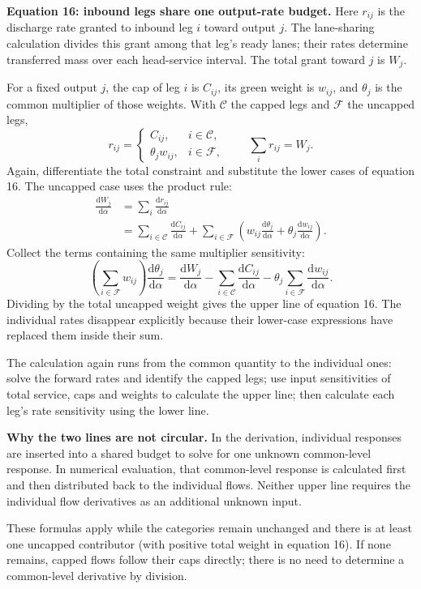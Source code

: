 \documentclass[11pt,a4paper]{article}
\newcommand{\der}[1]{\frac{\mathrm d #1}{\mathrm d\alpha}}
\begin{document}
\newpage
\textbf{Equation 16: inbound legs share one output-rate budget.}
Here $r_{ij}$ is the discharge rate granted to inbound leg $i$ toward
output $j$. The lane-sharing calculation divides this grant among that
leg's ready lanes; their rates determine transferred mass over each
head-service interval. The total grant toward $j$ is $W_j$.

For a fixed output $j$, the cap of leg $i$ is $C_{ij}$, its green weight
is $w_{ij}$, and $\theta_j$ is the common multiplier of those weights.
With $\mathcal C$ the capped legs and $\mathcal F$ the uncapped legs,
\[
 r_{ij}=
 \begin{cases}
 C_{ij},&i\in\mathcal C,\\
 \theta_jw_{ij},&i\in\mathcal F,
 \end{cases}
 \qquad \sum_i r_{ij}=W_j.
\]
Again, differentiate the total constraint and substitute the lower cases
of equation 16. The uncapped case uses the product rule:
\begin{align*}
 \der{W_j}
 &=\sum_i\der{r_{ij}}\\
 &=\sum_{i\in\mathcal C}\der{C_{ij}}
   +\sum_{i\in\mathcal F}
       \left(w_{ij}\der{\theta_j}
             +\theta_j\der{w_{ij}}\right).
\end{align*}
Collect the terms containing the same multiplier sensitivity:
\[
 \left(\sum_{i\in\mathcal F}w_{ij}\right)\der{\theta_j}
 =\der{W_j}-\sum_{i\in\mathcal C}\der{C_{ij}}
          -\theta_j\sum_{i\in\mathcal F}\der{w_{ij}}.
\]
Dividing by the total uncapped weight gives the upper line of equation 16.
The individual rates disappear explicitly because their lower-case
expressions have replaced them inside their sum.

The calculation again runs from the common quantity to the individual
ones: solve the forward rates and identify the capped legs; use input
sensitivities of total service, caps and weights to calculate the upper
line; then calculate each leg's rate sensitivity using the lower line.

\textbf{Why the two lines are not circular.}
In the derivation, individual responses are inserted into a shared budget
to solve for one unknown common-level response. In numerical evaluation,
that common-level response is calculated first and then distributed back
to the individual flows. Neither upper line requires the individual flow
derivatives as an additional unknown input.

These formulas apply while the categories remain unchanged and there is
at least one uncapped contributor (with positive total weight in equation
16). If none remains, capped flows follow their caps directly; there is
no need to determine a common-level derivative by division.
\end{document}
